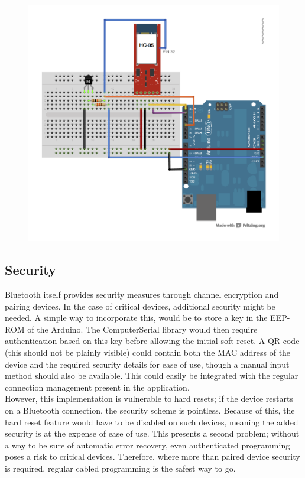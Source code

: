 		\begin{figure}[H]
		\centering
		\label{fig:hardReset}
		\includegraphics[scale=0.8]{images/wiring_hardReset.png}
		\end{figure}
	
    \subsection{Security}
	Bluetooth itself provides security measures through channel encryption and pairing devices. In the case of
    critical devices, additional security might be needed. A simple way to incorporate this, would be to store a
    key in the EEP-ROM of the Arduino. The ComputerSerial library would then require authentication based on this
    key before allowing the initial soft reset. A QR code (this should not be plainly visible) could contain
    both the MAC address of the device and the required security details for ease of use, though a manual input
    method should also be available. This could easily be integrated with the regular connection management present
    in the application.\\
    
    However, this implementation is vulnerable to hard resets; if the device restarts on a Bluetooth connection, the
    security scheme is pointless. Because of this, the hard reset feature would have to be disabled on such devices,
    meaning the added security is at the expense of ease of use. This presents a second problem; without a way to be
    sure of automatic error recovery, even authenticated programming poses a risk to critical devices. Therefore, where more than paired device security is required, regular cabled programming is the safest way to go.
    
